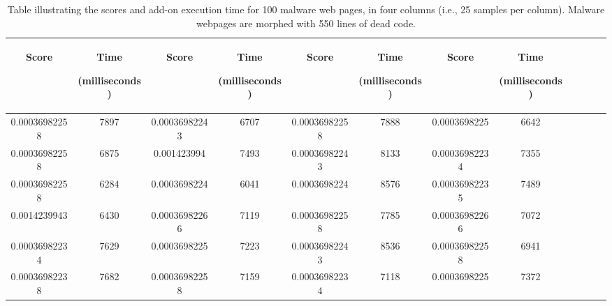 \begin {table}[h]
\caption[Scores table of malware web pages]{Table illustrating the scores and add-on execution time for 100 malware web pages, in four columns (i.e., 25 samples per column). Malware webpages are morphed with 550 lines of dead code. }
    \label{tab:m500table}
  \centering
  \begin{tabular}{|c|c|c|c|c|c|c|c|c|c|c|c|} 
  \midrule
 \begin{sideways}Score\end{sideways}& \begin{sideways}Time\end{sideways} \begin{sideways} (milliseconds)\end{sideways}& \begin{sideways}Score\end{sideways}& \begin{sideways}Time\end{sideways}  \begin{sideways}(milliseconds)\end{sideways}& \begin{sideways}Score\end{sideways}& \begin{sideways}Time\end{sideways}  \begin{sideways}(milliseconds)\end{sideways}& \begin{sideways}Score\end{sideways}& \begin{sideways}Time\end{sideways}  \begin{sideways} (milliseconds)\end{sideways}\\
\midrule
0.00036982258&7897&0.00036982243&6707&0.00036982258&7888&0.0003698225&6642\\
\midrule
0.00036982258&6875&0.001423994&7493&0.00036982243&8133&0.00036982234&7355\\
\midrule
0.00036982258&6284&0.0003698224&6041&0.0003698224&8576&0.00036982235&7489\\
\midrule
0.0014239943&6430&0.00036982266&7119&0.00036982258&7785&0.00036982266&7072\\
\midrule
0.00036982234&7629&0.0003698225&7223&0.00036982243&8536&0.00036982258&6941\\
\midrule
0.00036982238&7682&0.00036982258&7159&0.00036982234&7118&0.0003698225&7372\\

\end{tabular}
\end{table}
